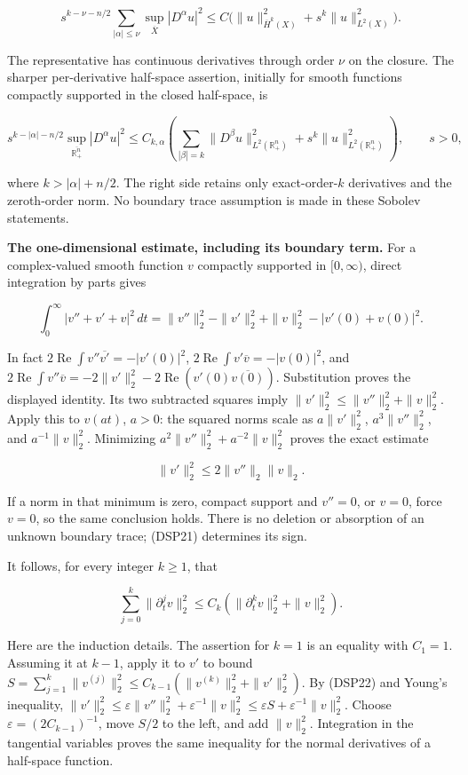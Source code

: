 \documentclass[
  11pt,
]{article}
\begin{document}
\[
 s^{k-\nu-n/2}\sum_{|\alpha|\leq\nu}\sup_{\overline X}|D^\alpha u|^2
 \leq C\bigl(\|u\|_{\overline H^k(X)}^2+s^k\|u\|_{L^2(X)}^2\bigr).
 \tag{DSP19}
\]

The representative has continuous derivatives through order \(\nu\) on
the closure. The sharper per-derivative half-space assertion, initially
for smooth functions compactly supported in the closed half-space, is

\[
 s^{k-|\alpha|-n/2}\sup_{\overline{\mathbb R^n_+}}|D^\alpha u|^2
 \leq C_{k,\alpha}\left(\sum_{|\beta|=k}\|D^\beta u\|_{L^2(\mathbb R^n_+)}^2
 +s^k\|u\|_{L^2(\mathbb R^n_+)}^2\right),\qquad s>0,
 \tag{DSP20}
\]

where \(k>|\alpha|+n/2\). The right side retains only exact-order-\(k\)
derivatives and the zeroth-order norm. No boundary trace assumption is
made in these Sobolev statements.

\textbf{The one-dimensional estimate, including its boundary term.} For
a complex-valued smooth function \(v\) compactly supported in
\([0,\infty)\), direct integration by parts gives

\[
 \int_0^\infty|v''+v'+v|^2\,dt
 =\|v''\|_2^2-\|v'\|_2^2+\|v\|_2^2-|v'(0)+v(0)|^2.
 \tag{DSP21}
\]

In fact \(2\operatorname{Re}\int v''\overline{v'}=-|v'(0)|^2\),
\(2\operatorname{Re}\int v'\overline v=-|v(0)|^2\), and
\(2\operatorname{Re}\int v''\overline v=-2\|v'\|_2^2-2\operatorname{Re}(v'(0)\overline{v(0)})\).
Substitution proves the displayed identity. Its two subtracted squares
imply \(\|v'\|_2^2\leq\|v''\|_2^2+\|v\|_2^2\). Apply this to \(v(at)\),
\(a>0\): the squared norms scale as \(a\|v'\|_2^2\), \(a^3\|v''\|_2^2\),
and \(a^{-1}\|v\|_2^2\). Minimizing \(a^2\|v''\|_2^2+a^{-2}\|v\|_2^2\)
proves the exact estimate

\[
 \|v'\|_2^2\leq2\|v''\|_2\|v\|_2.
 \tag{DSP22}
\]

If a norm in that minimum is zero, compact support and \(v''=0\), or
\(v=0\), force \(v=0\), so the same conclusion holds. There is no
deletion or absorption of an unknown boundary trace; (DSP21) determines
its sign.

It follows, for every integer \(k\geq1\), that

\[
 \sum_{j=0}^k\|\partial_t^jv\|_2^2\leq C_k(\|\partial_t^kv\|_2^2+\|v\|_2^2).
 \tag{DSP23}
\]

Here are the induction details. The assertion for \(k=1\) is an equality
with \(C_1=1\). Assuming it at \(k-1\), apply it to \(v'\) to bound
\(S=\sum_{j=1}^k\|v^{(j)}\|_2^2\leq C_{k-1}(\|v^{(k)}\|_2^2+\|v'\|_2^2)\).
By (DSP22) and Young's inequality,
\(\|v'\|_2^2\leq\varepsilon\|v''\|_2^2+\varepsilon^{-1}\|v\|_2^2\leq\varepsilon S+\varepsilon^{-1}\|v\|_2^2\).
Choose \(\varepsilon=(2C_{k-1})^{-1}\), move \(S/2\) to the left, and
add \(\|v\|_2^2\). Integration in the tangential variables proves the
same inequality for the normal derivatives of a half-space function.
\end{document}
